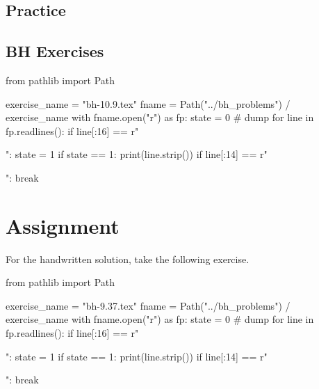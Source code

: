 \subsection{Practice}
\label{sec:practice}




\subsection{BH Exercises}
\label{sec:bh-exercises-1}


\begin{pycode}
from pathlib import Path

exercise_name = "bh-10.9.tex"
fname = Path("../bh_problems") / exercise_name
with fname.open("r") as fp:
    state = 0  # dump
    for line in fp.readlines():
        if line[:16] == r"\begin{exercise}":
            state = 1
        if state == 1:
            print(line.strip())
        if line[:14] == r"\end{exercise}":
            break
\end{pycode}







\section{Assignment}
\label{sec:assignment}

For the handwritten solution, take the following exercise.

\begin{pycode}
from pathlib import Path

exercise_name = "bh-9.37.tex"
fname = Path("../bh_problems") / exercise_name
with fname.open("r") as fp:
    state = 0  # dump
    for line in fp.readlines():
        if line[:16] == r"\begin{exercise}":
            state = 1
        if state == 1:
            print(line.strip())
        if line[:14] == r"\end{exercise}":
            break
\end{pycode}






